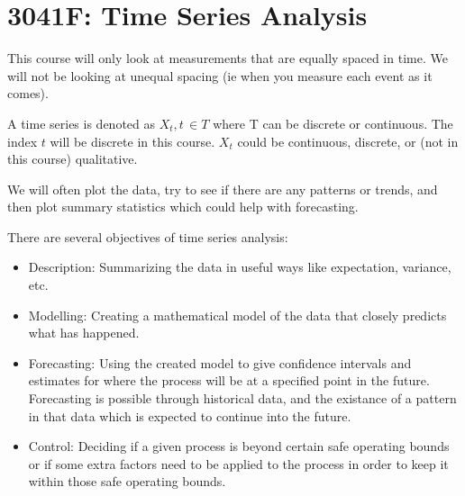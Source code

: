     \section{3041F: Time Series Analysis}
    This course will only look at measurements that are equally spaced in time. We will not be looking at unequal spacing (ie when you measure each event as it comes).

    A time series is denoted as \(X_t, t \, \in T\) where T can be discrete or continuous.\newline
    The index \(t\) will be discrete in this course.
    \(X_t\) could be continuous, discrete, or (not in this course) qualitative. \newline \newline

    We will often plot the data, try to see if there are any patterns or trends, and then plot summary statistics which could help with forecasting.


    There are several objectives of time series analysis:
    \begin{itemize} 
        \item Description: Summarizing the data in useful ways like expectation, variance, etc.
        \item Modelling: Creating a mathematical model of the data that closely predicts what has happened.
        \item Forecasting: Using the created model to give confidence intervals and estimates for where the process will be at a specified point in the future.  Forecasting is possible through historical data, and the existance of a pattern in that data which is expected to continue into the future.
        \item Control: Deciding if a given process is beyond certain safe operating bounds or if some extra factors need to be applied to the process in order to keep it within those safe operating bounds.
    \end{itemize} 

